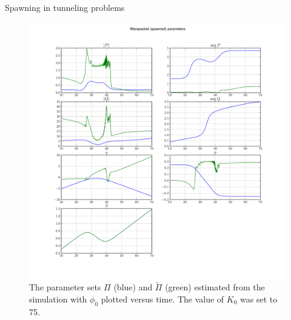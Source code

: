 \begin{chapter}{Spawning in tunneling problems}
\begin{figure}[h!]
  \centering
  \includegraphics[width=\the\linewidth]{./figures/eckart_spawn_apost_phi0_K75/wavepacket_parameters_abs_ang_spawned.pdf}
  \caption[The parameter sets $\Pi$ and $\tilde{\Pi}$]{The parameter sets $\Pi$
  (blue) and $\tilde{\Pi}$ (green) estimated from the simulation with $\phi_0$
  plotted versus time. The value of $K_0$ was set to 75.}
  \label{fig:tunnel_spawn_apost_K50_parameters}
\end{figure}


\end{chapter}
